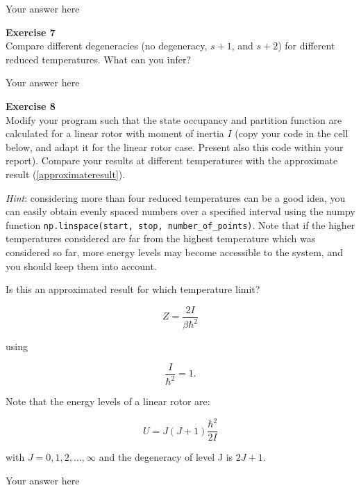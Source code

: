 \documentclass{article}
\begin{document}
Your answer here

\begin{mdframed}
\textbf{Exercise 7}\\
Compare different degeneracies (no degeneracy, $s+1$, and $s+2$) for different reduced temperatures. What can you infer?
\end{mdframed}

Your answer here

\begin{mdframed}
\textbf{Exercise 8}\\
Modify your program such that the state occupancy and partition
function are calculated for a linear rotor with moment of inertia $I$ (copy your code in the cell below, and adapt it for the linear rotor case. Present also this code within your report). Compare your results at different temperatures with the approximate result (\ref{approximateresult}).

\textit{Hint}: considering more than four reduced temperatures can be a good idea, you can easily obtain evenly spaced numbers over a specified interval using the numpy function \texttt{np.linspace(start, stop, number\_of\_points)}.
Note that if the higher temperatures considered are far from the highest temperature which was considered so far, more energy levels may become accessible to the system, and you should keep them into account.

Is this an approximated result for which temperature limit?

\begin{equation}
\label{approximateresult}
Z = \frac{2I}{\beta\hbar^2}
\end{equation}

using

\begin{equation}
\frac{I}{\hbar^2} = 1.
\end{equation}

Note that the energy levels of a linear rotor are:

\begin{equation}
U = J(J+1)\frac{\hbar^2}{2I}
\end{equation}

with $J= 0, 1, 2, \dots, \infty$ and the degeneracy of level J is $2J +1$.
\end{mdframed}

Your answer here
\end{document}
